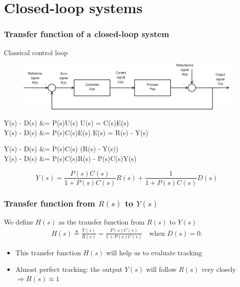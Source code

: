 \section{Closed-loop systems}
\begin{frame}
	\frametitle{Transfer function of a closed-loop system}
	\begin{block}{Classical control loop}
		\begin{figure}
			\centering
			\includegraphics[width=1\linewidth]{Closed-Loop}
			\label{fig:Closed-Loop2}
		\end{figure}
		\vspace{0.2em}
	\end{block}
	\begin{block}{}
		\begin{flalign*}
			Y(s) - D(s) &= P(s)U(s) \quad {} U(s) = C(s)E(s) \\
			Y(s) - D(s) &= P(s)C(s)E(s) \quad {} E(s) = R(s) - Y(s) \\
		\end{flalign*}
	\end{block}
\end{frame}
\begin{frame}
	\begin{block}{}
		\begin{flalign*}
			Y(s) - D(s) &= P(s)C(s) (R(s) - Y(s)) \\
			Y(s) - D(s) &= P(s)C(s)R(s) - P(s)C(s)Y(s) \\
		\end{flalign*}
	\end{block}
	\begin{alertblock}{}
		\[
			Y(s) = \frac{P(s)C(s)}{1 + P(s)C(s)}R(s) + \frac{1}{1 + P(s)C(s)}D(s)
		\]
	\end{alertblock}
\end{frame}


\begin{frame}
	\frametitle{Transfer function from $R(s)$ to $Y(s)$}
	\begin{definition}
		We define $H(s)$ as the transfer function from $R(s)$ to $Y(s)$
		\begin{align*}
		H(s) \triangleq \frac{Y(s)}{R(s)} = \frac{P(s)C(s)}{1 + P(s) C(s)} \quad \text{when } D(s) = 0.
		\end{align*}
		\begin{itemize}
			\item This transfer function $H(s)$ will help us to evaluate tracking
			
			\item Almost perfect tracking: the output $Y(s)$ will follow $R(s)$ very closely $\Rightarrow H(s) \approx 1$
		\end{itemize}
	\end{definition}
	
\end{frame}


